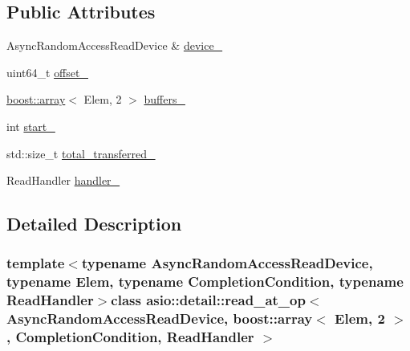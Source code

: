 \subsection*{Public Attributes}
\begin{DoxyCompactItemize}
\item 
Async\+Random\+Access\+Read\+Device \& \hyperlink{classasio_1_1detail_1_1read__at__op_3_01_async_random_access_read_device_00_01boost_1_1array_3_00756f1b0c223a71b75bb1b3f8c0f0e31_a204ee03f7357d0da4c73da47a7ac508b}{device\+\_\+}
\item 
uint64\+\_\+t \hyperlink{classasio_1_1detail_1_1read__at__op_3_01_async_random_access_read_device_00_01boost_1_1array_3_00756f1b0c223a71b75bb1b3f8c0f0e31_ad8bc6b939a5de86b3fe7a282697d2a31}{offset\+\_\+}
\item 
\hyperlink{classboost_1_1array}{boost\+::array}$<$ Elem, 2 $>$ \hyperlink{classasio_1_1detail_1_1read__at__op_3_01_async_random_access_read_device_00_01boost_1_1array_3_00756f1b0c223a71b75bb1b3f8c0f0e31_a96cfef1ca59c13319ec55dc8d6a35479}{buffers\+\_\+}
\item 
int \hyperlink{classasio_1_1detail_1_1read__at__op_3_01_async_random_access_read_device_00_01boost_1_1array_3_00756f1b0c223a71b75bb1b3f8c0f0e31_a53d4dd2229b6dee78906cdc98a7a007e}{start\+\_\+}
\item 
std\+::size\+\_\+t \hyperlink{classasio_1_1detail_1_1read__at__op_3_01_async_random_access_read_device_00_01boost_1_1array_3_00756f1b0c223a71b75bb1b3f8c0f0e31_a67f2136b93643478d60eed159f4e172e}{total\+\_\+transferred\+\_\+}
\item 
Read\+Handler \hyperlink{classasio_1_1detail_1_1read__at__op_3_01_async_random_access_read_device_00_01boost_1_1array_3_00756f1b0c223a71b75bb1b3f8c0f0e31_a7bc5d59f8dad58e488e626517eafcb68}{handler\+\_\+}
\end{DoxyCompactItemize}


\subsection{Detailed Description}
\subsubsection*{template$<$typename Async\+Random\+Access\+Read\+Device, typename Elem, typename Completion\+Condition, typename Read\+Handler$>$class asio\+::detail\+::read\+\_\+at\+\_\+op$<$ Async\+Random\+Access\+Read\+Device, boost\+::array$<$ Elem, 2 $>$,                           Completion\+Condition, Read\+Handler $>$}



